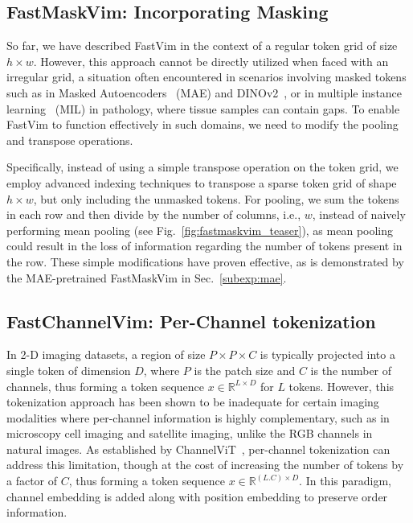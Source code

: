\subsection{FastMaskVim: Incorporating Masking}
\label{subsec:masking}

So far, we have described FastVim in the context of a regular token grid of size $h \times w$. However, this approach cannot be directly utilized when faced with an irregular grid, a situation often encountered in scenarios involving masked tokens such as in Masked Autoencoders~\cite{mae, zhouhypermae} (MAE) and DINOv2~\cite{dinov2}, or in multiple instance learning~\cite{abmil, simil} (MIL) in pathology, where tissue samples can contain gaps. To enable FastVim to function effectively in such domains, we need to modify the pooling and transpose operations.

Specifically, instead of using a simple transpose operation on the token grid, we employ advanced indexing techniques to transpose a sparse token grid of shape $h \times w$, but only including the unmasked tokens. For pooling, we sum the tokens in each row and then divide by the number of columns, i.e., $w$, instead of naively performing mean pooling (see Fig.~\ref{fig:fastmaskvim_teaser}), as mean pooling could result in the loss of information regarding the number of tokens present in the row. These simple modifications have proven effective, as is  demonstrated by the MAE-pretrained FastMaskVim in Sec.~\ref{subexp:mae}.



\subsection{FastChannelVim: Per-Channel tokenization}
\label{subsec:channelmodeling}

In 2-D imaging datasets, a region of size $P \times P \times C$ is typically projected into a single token of dimension $D$, where $P$ is the patch size and $C$ is the number of channels, thus forming a token sequence $x \in \mathbb{R}^{L \times D}$ for $L$ tokens. However, this tokenization approach has been shown to be inadequate for certain imaging modalities where per-channel information is highly complementary, such as in microscopy cell imaging and satellite imaging, unlike the RGB channels in natural images. As established by ChannelViT~\cite{channelvit}, per-channel tokenization can address this limitation, though at the cost of increasing the number of tokens by a factor of $C$, thus forming a token sequence $x \in \mathbb{R}^{(L.C) \times D}$. In this paradigm, channel embedding is added along with position embedding to preserve order information.


